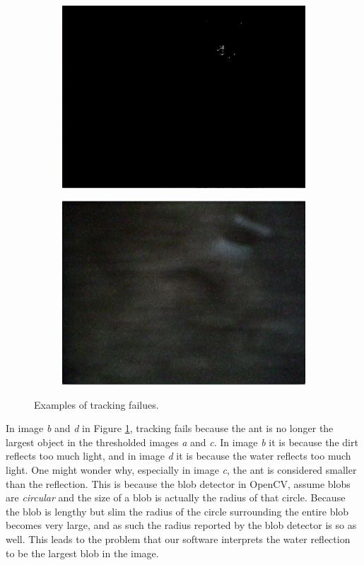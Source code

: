 \begin{figure}
\begin{subfigure}[b]{0.35\textwidth}
                \caption{}
        \end{subfigure}\\ \mbox{}\\
        \begin{subfigure}[b]{0.35\textwidth}
                \includegraphics[scale = 0.3]{img/bad4t}
                \caption{}
        \end{subfigure}
		\quad
        \begin{subfigure}[b]{0.35\textwidth}
                \includegraphics[scale = 0.3]{img/bad4}
                \caption{}
        \end{subfigure}
		\caption{Examples of tracking failues.}
		\label{fig:ant_fail}
\end{figure}

In image \emph{b} and \emph{d} in Figure \ref{fig:ant_fail}, tracking fails because the ant is no longer the largest object in the thresholded images \emph{a} and \emph{c}. In image \emph{b} it is because the dirt reflects too much light, and in image \emph{d} it is because the water reflects too much light. One might wonder why, especially in image \emph{c}, the ant is considered smaller than the reflection. This is because the blob detector in OpenCV, assume blobs are \emph{circular} and the size of a blob is actually the radius of that circle. Because the blob is lengthy but slim the radius of the circle surrounding the entire blob becomes very large, and as such the radius reported by the blob detector is so as well. This leads to the problem that our software interprets the water reflection to be the largest blob in the image. \\

